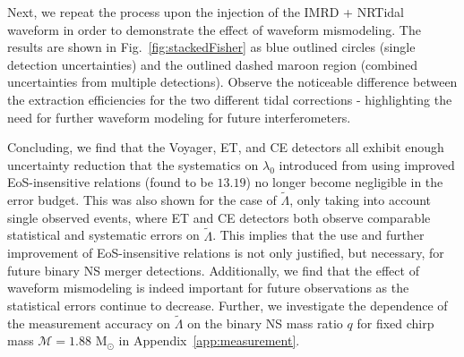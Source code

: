 \documentclass[prd,twocolumn,nofootinbib,superscriptaddress,amsmath,amssymb]{revtex4-1}
\begin{document}
Next, we repeat the process upon the injection of the IMRD + NRTidal waveform in order to demonstrate the effect of waveform mismodeling.
The results are shown in Fig.~\ref{fig:stackedFisher} as blue outlined circles (single detection uncertainties) and the outlined dashed maroon region (combined uncertainties from multiple detections).
Observe the noticeable difference between the extraction efficiencies for the two different tidal corrections - highlighting the need for further waveform modeling for future interferometers.

Concluding, we find that the Voyager, ET, and CE detectors all exhibit enough uncertainty reduction that the systematics on $\lambda_0$ introduced from using improved EoS-insensitive relations (found to be $13.19$) no longer become negligible in the error budget.
This was also shown for the case of $\tilde\Lambda$, only taking into account single observed events, where ET and CE detectors both observe comparable statistical and systematic errors on $\tilde\Lambda$.
This implies that the use and further improvement of EoS-insensitive relations is not only justified, but necessary, for future binary NS merger detections.
Additionally, we find that the effect of waveform mismodeling is indeed important for future observations as the statistical errors continue to decrease.
Further, we investigate the dependence of the measurement accuracy on $\tilde\Lambda$ on the binary NS mass ratio $q$ for fixed chirp mass $\mathcal{M}=1.88\text{ M}_{\odot}$ in Appendix~\ref{app:measurement}.

\end{document}
